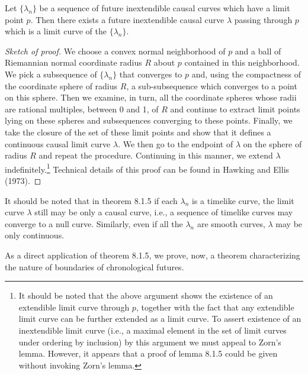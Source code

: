 \begin{lemma}\label{lem:8.1.5}
Let \(\{\lambda_n\}\) be a sequence of future inextendible causal curves which have
a limit point \(p\). Then there exists a future inextendible causal curve \(\lambda\)
passing through \(p\) which is a limit curve of the \(\{\lambda_n\}\).
\end{lemma}
\begin{proof}[Sketch of proof]
We choose a convex normal neighborhood of \(p\) and a ball of Riemannian normal
coordinate radius \(R\) about \(p\) contained in this neighborhood. We pick a
subsequence of \(\{\lambda_n\}\) that converges to \(p\) and, using the compactness
of the coordinate sphere of radius \(R\), a sub-subsequence which converges to a
point on this sphere. Then we examine, in turn, all the coordinate spheres whose
radii are rational multiples, between 0 and 1, of \(R\) and continue to extract limit
points lying on these spheres and subsequences converging to these points. Finally,
we take the closure of the set of these limit points and show that it defines a
continuous causal limit curve \(\lambda\). We then go to the endpoint of \(\lambda\)
on the sphere of radius \(R\) and repeat the procedure. Continuing in this manner,
we extend \(\lambda\) indefinitely.\footnote{It should be noted that the above
argument shows the existence of an extendible limit curve through \(p\), together
with the fact that any extendible limit curve can be further extended as a limit curve.
To assert existence of an inextendible limit curve (i.e., a maximal element in the
set of limit curves under ordering by inclusion) by this argument we must appeal to
Zorn's lemma. However, it appears that a proof of lemma 8.1.5 could be given
without invoking Zorn's lemma.} Technical details of this proof can be found in
Hawking and Ellis (1973).
\end{proof}

It should be noted that in theorem 8.1.5 if each \(\lambda_n\) is a timelike curve,
the limit curve \(\lambda\) still may be only a causal curve, i.e., a sequence of
timelike curves may converge to a null curve. Similarly, even if all the
\(\lambda_n\) are smooth curves, \(\lambda\) may be only continuous.

As a direct application of theorem 8.1.5, we prove, now, a theorem characterizing
the nature of boundaries of chronological futures.

